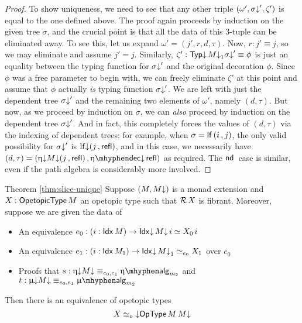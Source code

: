 \begin{proof}
  To show uniqueness, we need to see that any other triple
  $(\omega',\sigma{\downarrow}',\zeta')$ is equal to the one defined above.
  The proof again proceeds by induction on the given tree $\sigma$,
  and the crucial point is that all the data of this 3-tuple can be
  eliminated away.  To see this, let us expand
  $\omega' = (j',r,d,\tau)$.  Now, $r : j' \equiv j$, so we may
  eliminate and assume $j' = j$. Similarly,
  $\zeta' : \mathsf{Typ}{\downarrow}\, M{\downarrow}_1 \sigma{\downarrow}' \equiv \phi$ is just an equality
  between the typing function for $\sigma{\downarrow}'$ and the original
  decoration $\phi$.  Since $\phi$ was a free parameter to begin with,
  we can freely eliminate $\zeta'$ at this point and assume that
  $\phi$ actually \emph{is} typing function $\sigma{\downarrow}'$.  We are left
  with just the dependent tree $\sigma{\downarrow}'$ and the remaining two
  elements of $\omega'$, namely $(d, \tau)$.  But now, as we proceed
  by induction on $\sigma$, we can \emph{also} proceed by induction on
  the dependent tree $\sigma{\downarrow}'$.  And in fact, this completely
  forces the values of $(d, \tau)$ via the indexing of dependent
  trees: for example, when $\sigma = \mathsf{lf}\, (i \,, j)$, the only valid
  possibility for $\sigma{\downarrow}'$ is $\operatorname{lf{\downarrow}} (j \,, \mathsf{refl})$, and in this
  case, we necessarily have
  $(d,\tau) = (\upetad M\da (j \,, \refl) \,, \etadecd \refl)$ as
  required. The $\mathsf{nd}\,$ case is similar, even if the path algebra is
  considerably more involved.
\end{proof}

\begin{thm-apdx}{Theorem \ref{thm:slice-unique}}
  Suppose $(M , M{\downarrow})$ is a monad extension and $X : \mathsf{OpetopicType}\, M$
  an opetopic type such that $\mathcal{R}\, X$ is fibrant.  Moreover,
  suppose we are given the data of
  \begin{itemize}
  \item An equivalence $e_0 : (i : \mathsf{Idx}\, M) \to \mathsf{Idx}{\downarrow}\, M{\downarrow}\, i \simeq X_0\, i$
  \item An equivalence $e_1 : (i : \mathsf{Idx}\, M_1) \to \mathsf{Idx}{\downarrow}\, M{\downarrow}_1 \simeq_{e_0} X_1$ over $e_0$
  \item Proofs that $s : \upetad M\da \equiv_{e_0 , e_1} \upeta\alg_{m_2}$ and $t : \upmud M\da \equiv_{e_0 , e_1} \upmu\alg_{m_2}$    
  \end{itemize}
  Then there is an equivalence of opetopic types
  \[ X \simeq_{o} {\downarrow}\mathsf{OpType}\, M\, M{\downarrow} \]
\end{thm-apdx}

